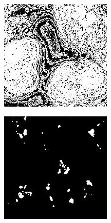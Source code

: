 \begin{figure}
\begin{subfigure}[b]{0.22\textwidth}
		\caption{}
		\label{subfig:clipping}
	\end{subfigure}
	\hfill
	\begin{subfigure}[b]{0.22\textwidth}
		\centering
		\includegraphics[width=\textwidth]{bilder/preprocessing/crop_golgi_not_full_processed_mask.png}
		\caption{}
		\label{subfig:vanilla-mask}
	\end{subfigure}
	\hfill
	\begin{subfigure}[b]{0.22\textwidth}
		\centering
		\includegraphics[width=\textwidth]{bilder/preprocessing/crop_golgi_full_processed_mask.png}

\end{subfigure}
\end{figure}
